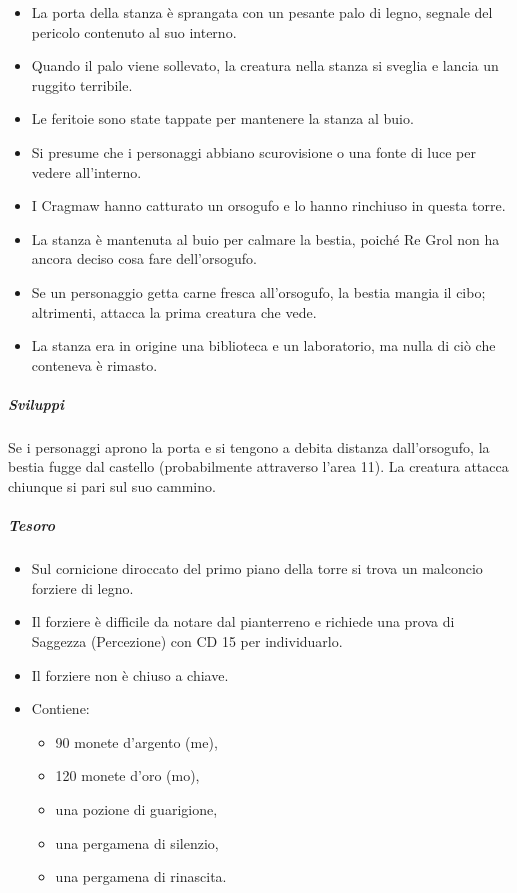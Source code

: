 \documentclass{article}
\begin{document}
    \begin{itemize}
        \item La porta della stanza è sprangata con un pesante palo di legno, segnale del pericolo contenuto al suo interno.
        \item Quando il palo viene sollevato, la creatura nella stanza si sveglia e lancia un ruggito terribile.
        \item Le feritoie sono state tappate per mantenere la stanza al buio.
        \item Si presume che i personaggi abbiano scurovisione o una fonte di luce per vedere all'interno.
        \item I Cragmaw hanno catturato un orsogufo e lo hanno rinchiuso in questa torre.
        \item La stanza è mantenuta al buio per calmare la bestia, poiché Re Grol non ha ancora deciso cosa fare dell'orsogufo.
        \item Se un personaggio getta carne fresca all'orsogufo, la bestia mangia il cibo; altrimenti, attacca la prima creatura che vede.
        \item La stanza era in origine una biblioteca e un laboratorio, ma nulla di ciò che conteneva è rimasto.
    \end{itemize}

    \subparagraph{Sviluppi}  Se i personaggi aprono la porta e si tengono a debita distanza
    dall’orsogufo, la bestia fugge dal castello (probabilmente
    attraverso l’area 11). La creatura attacca chiunque si pari
    sul suo cammino.
    
    \subparagraph{Tesoro}
    \begin{itemize}
        \item Sul cornicione diroccato del primo piano della torre si trova un malconcio forziere di legno.
        \item Il forziere è difficile da notare dal pianterreno e richiede una prova di Saggezza (Percezione) con CD 15 per individuarlo.
        \item Il forziere non è chiuso a chiave.
        \item Contiene:
        \begin{itemize}
            \item 90 monete d'argento (me),
            \item 120 monete d'oro (mo),
            \item una pozione di guarigione,
            \item una pergamena di silenzio,
            \item una pergamena di rinascita.
        \end{itemize}
    \end{itemize}
\end{document}
